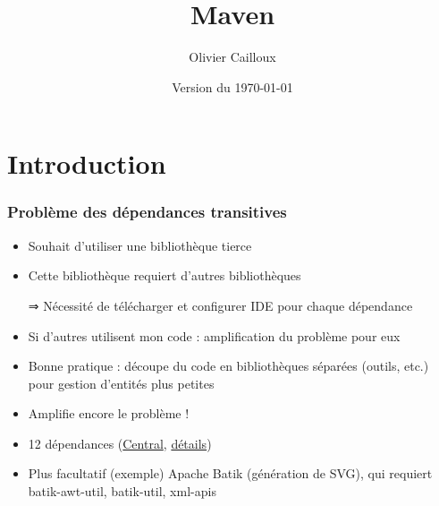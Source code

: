\documentclass[english, french]{beamer}
\title{Maven}
\author{Olivier Cailloux}
\institute[LAMSADE]{LAMSADE, Université Paris-Dauphine}
\date{Version du \today}
\begin{document}


\begin{frame}[plain]
   \titlepage
\end{frame}
\addtocounter{framenumber}{-1}

\section{Introduction}
\begin{frame}
	\frametitle{Problème des dépendances transitives}
	\begin{itemize}
		\item Souhait d’utiliser une bibliothèque tierce
		\item Cette bibliothèque requiert d’autres bibliothèques
		\item[⇒] Nécessité de télécharger et configurer IDE pour chaque dépendance
		\item Si d’autres utilisent mon code : amplification du problème pour eux
		\item Bonne pratique : découpe du code en bibliothèques séparées (outils, etc.) pour gestion d’entités plus petites
		\item Amplifie encore le problème !
	\end{itemize}
	\begin{example}[JasperReports]
		\begin{itemize}
			\item 12 dépendances {\tiny (\href{http://search.maven.org/\#artifactdetails\%7Cnet.sf.jasperreports\%7Cjasperreports\%7C6.20.0\%7Cjar}{Central}, \href{https://mvnrepository.com/artifact/net.sf.jasperreports/jasperreports/6.20.0}{détails})}
			\item Plus facultatif (exemple) Apache Batik (génération de SVG), qui requiert batik-awt-util, batik-util, xml-apis
		\end{itemize}
	\end{example}
\end{frame}
\end{document}
